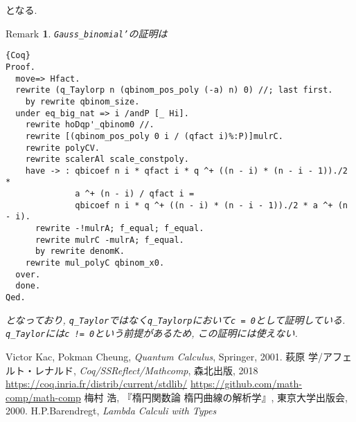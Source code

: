 \documentclass[11pt]{jarticle}
\theoremstyle{mystyle}
\newtheorem{rmk}[df]{$\textrm{Remark}$}
\newcommand{\brmk}{\begin{rmk}}
\newcommand{\ermk}{\end{rmk}}
\newcommand{\0}{\textbf{0}}
\newcommand{\1}{\textbf{1}}
\newcommand{\2}{\textbf{2}}
\begin{document}
となる. 
\brmk
{\tt Gauss\_binomial'}の証明は
\begin{lstlisting}{Coq}
Proof.
  move=> Hfact.
  rewrite (q_Taylorp n (qbinom_pos_poly (-a) n) 0) //; last first.
    by rewrite qbinom_size.
  under eq_big_nat => i /andP [_ Hi].
    rewrite hoDqp'_qbinom0 //.
    rewrite [(qbinom_pos_poly 0 i / (qfact i)%:P)]mulrC.
    rewrite polyCV.
    rewrite scalerAl scale_constpoly.
    have -> : qbicoef n i * qfact i * q ^+ ((n - i) * (n - i - 1))./2 *
              a ^+ (n - i) / qfact i =
              qbicoef n i * q ^+ ((n - i) * (n - i - 1))./2 * a ^+ (n - i).
      rewrite -!mulrA; f_equal; f_equal.
      rewrite mulrC -mulrA; f_equal.
      by rewrite denomK.
    rewrite mul_polyC qbinom_x0.
  over.
  done.
Qed. \end{lstlisting}
となっており, {\tt q\_Taylor}ではなく{\tt q\_Taylorp}において{\tt c = 0}として証明している. 
{\tt q\_Taylor}には{\tt c != 0}という前提があるため, この証明には使えない. 
\ermk
\begin{thebibliography}{9}
   Victor Kac, Pokman Cheung, {\it{Quantum Calculus}}, Springer, 2001.
   萩原 学/アフェルト・レナルド, {\it Coq/SSReflect/Mathcomp}, 森北出版, 
    2018
   \url{https://coq.inria.fr/distrib/current/stdlib/}
   \url{https://github.com/math-comp/math-comp}
   梅村 浩, 『楕円関数論  楕円曲線の解析学』, 東京大学出版会, 2000.
   H.P.Barendregt, {\it{Lambda Calculi with Types}}
\end{thebibliography}
\end{document}
